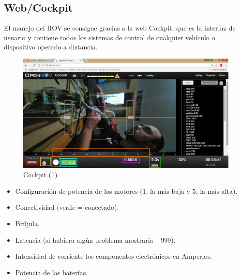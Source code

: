 \newpage
\subsection{Web/Cockpit}
\label{subsec:cockpit}
El manejo del ROV se consigue gracias a la web Cockpit, que es la interfaz de usuario y contiene todos los sistemas de control de cualquier vehículo o dispositivo operado a distancia.

\begin{figure} [hbtp]
\begin{center}
  \includegraphics[width=15cm]{img/cap3/3_5/cockpit1_v2}
\end{center}
\caption{Cockpit (1)}
\label{fig:cockpit1}
\end{figure}

\begin{itemize}
\item[\textcolor{red}{\textbullet}]Configuración de potencia de los motores (1, la más baja y 5, la más alta).
\item[\textcolor{yellow}{\textbullet}]Conectividad (verde = conectado).
\item[\textcolor{orange}{\textbullet}]Brújula.
\item[\textcolor{blue}{\textbullet}]Latencia (si hubiera algún problema mostraría +999).
\item[\textcolor{purple}{\textbullet}]Intensidad de corriente los componentes electrónicos en Amperios.
\item[\textcolor{green}{\textbullet}]Potencia de las baterías.
\end{itemize}

